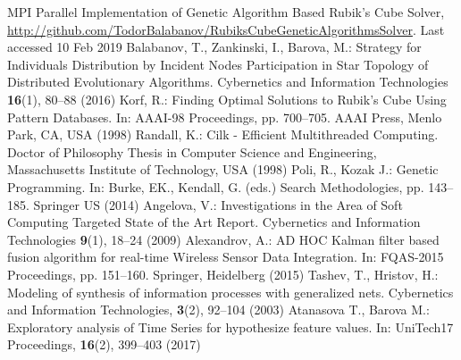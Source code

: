 \documentclass[runningheads]{llncs}
\begin{document}
\begin{thebibliography}{8}
MPI Parallel Implementation of Genetic Algorithm Based Rubik’s Cube Solver, \url{http://github.com/TodorBalabanov/RubiksCubeGeneticAlgorithmsSolver}. Last accessed 10 Feb 2019
Balabanov, T., Zankinski, I., Barova, M.: Strategy for Individuals Distribution by Incident Nodes Participation in Star Topology of Distributed Evolutionary Algorithms. Cybernetics and Information Technologies \textbf{16}(1), 80--88 (2016)
Korf, R.: Finding Optimal Solutions to Rubik’s Cube Using Pattern Databases. In: AAAI-98 Proceedings, pp. 700--705. AAAI Press, Menlo Park, CA, USA (1998)
Randall, K.: Cilk - Efficient Multithreaded Computing. Doctor of Philosophy Thesis in Computer Science and Engineering, Massachusetts Institute of Technology, USA (1998) 
Poli, R., Kozak J.: Genetic Programming. In: Burke, EK., Kendall, G. (eds.) Search Methodologies, pp. 143--185. Springer US (2014)
Angelova, V.: Investigations in the Area of Soft Computing Targeted State of the Art Report. Cybernetics and Information Technologies \textbf{9}(1), 18--24 (2009)
Alexandrov, A.: AD HOC Kalman filter based fusion algorithm for real-time Wireless Sensor Data Integration. In: FQAS-2015 Proceedings, pp. 151--160. Springer, Heidelberg (2015)
Tashev, T., Hristov, H.: Modeling of synthesis of information processes with generalized nets. Cybernetics and Information Technologies, \textbf{3}(2), 92--104 (2003) 
Atanasova T., Barova M.: Exploratory analysis of Time Series for hypothesize feature values. In: UniTech17 Proceedings,  \textbf{16}(2), 399--403 (2017)
\end{thebibliography}
\end{document}
